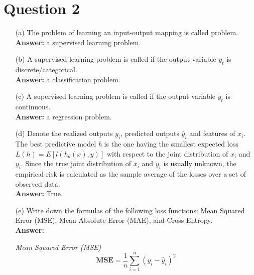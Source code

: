 \documentclass[12pt,letterpaper]{article}
\begin{document}
\section*{Question 2}
\begin{itemize}
    \item[(a)] The problem of learning an input-output mapping is called \underline{\hspace{3cm}} problem.
    \vspace{0.5cm}
    \\
    \textbf{Answer:} a supervised learning problem.
    
    \item[(b)] A supervised learning problem is called \underline{\hspace{3cm}} if the output variable \(y_t\) is discrete/categorical.
    \vspace{0.5cm}
    \\
    \textbf{Answer:} a classification problem.
    
    \item[(c)] A supervised learning problem is called \underline{\hspace{3cm}} if the output variable \(y_t\) is continuous.
    \vspace{0.5cm}
    \\
    \textbf{Answer:} a regression problem.
    
    \item[(d)] Denote the realized outputs \(y_i\), predicted outputs \(\hat{y}_i\) and features of \(x_i\).
    The best predictive model \textit{h} is the one having the smallest expected loss \(L(h) = E[l(h_{\theta}(x),y)]\) with
    respect to the joint distribution of \(x_i\) and \(y_i\). Since the true joint distribution of \(x_i\) and \(y_i\) is usually
    unknown, the empirical risk is calculated as the sample average of the losses over a set of observed data.
    \vspace{1.0cm}
    \\
    \textbf{Answer:} True.
    
    \item[(e)] Write down the formulas of the following loss functions: Mean Squared Error (MSE), Mean Absolute Error (MAE), and Cross Entropy.
    \vspace{1.0cm}
    \\
    \textbf{Answer:}
    
    \textit{Mean Squared Error (MSE)}
    \[
        \textbf{MSE} = \frac{1}{n}\sum_{i=1}^{n} (y_i - \hat{y}_i)^2
    \]
    

\end{itemize}
\end{document}
